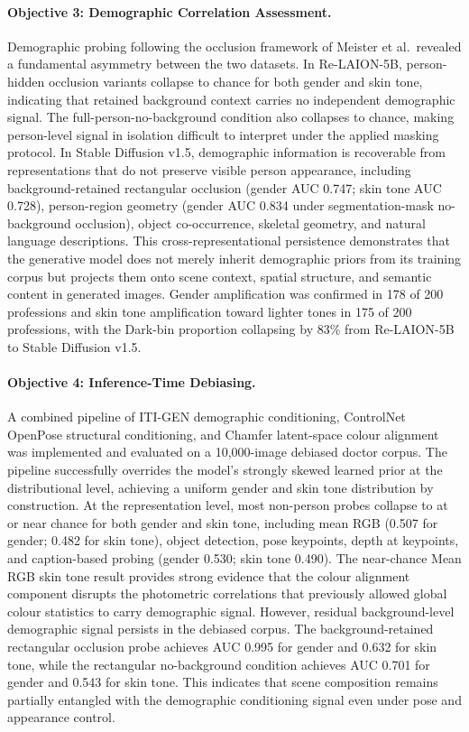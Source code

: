 \paragraph{Objective 3: Demographic Correlation Assessment.}
Demographic probing following the occlusion framework of Meister et al.\ revealed a
fundamental asymmetry between the two datasets. In Re-LAION-5B, person-hidden occlusion
variants collapse to chance for both gender and skin tone, indicating that retained
background context carries no independent demographic signal. The
full-person-no-background condition also collapses to chance, making person-level signal
in isolation difficult to interpret under the applied masking protocol. In Stable
Diffusion v1.5, demographic information is recoverable from representations that do not
preserve visible person appearance, including background-retained rectangular occlusion
(gender AUC 0.747; skin tone AUC 0.728), person-region geometry (gender AUC 0.834 under
segmentation-mask no-background occlusion), object co-occurrence, skeletal geometry, and
natural language descriptions. This cross-representational persistence demonstrates that
the generative model does not merely inherit demographic priors from its training corpus
but projects them onto scene context, spatial structure, and semantic content in generated
images. Gender amplification was confirmed in 178 of 200 professions and skin tone
amplification toward lighter tones in 175 of 200 professions, with the Dark-bin
proportion collapsing by 83\% from Re-LAION-5B to Stable Diffusion v1.5.

\paragraph{Objective 4: Inference-Time Debiasing.}
A combined pipeline of ITI-GEN demographic conditioning, ControlNet OpenPose structural
conditioning, and Chamfer latent-space colour alignment was implemented and evaluated on
a 10,000-image debiased doctor corpus. The pipeline successfully overrides the model's
strongly skewed learned prior at the distributional level, achieving a uniform gender and
skin tone distribution by construction. At the representation level, most non-person
probes collapse to at or near chance for both gender and skin tone, including mean RGB
(0.507 for gender; 0.482 for skin tone), object detection, pose keypoints, depth at
keypoints, and caption-based probing (gender 0.530; skin tone 0.490). The near-chance
Mean RGB skin tone result provides strong evidence that the colour alignment component
disrupts the photometric correlations that previously allowed global colour statistics to
carry demographic signal. However, residual background-level demographic signal persists
in the debiased corpus. The background-retained rectangular occlusion probe achieves AUC
0.995 for gender and 0.632 for skin tone, while the rectangular no-background condition
achieves AUC 0.701 for gender and 0.543 for skin tone. This indicates that scene
composition remains partially entangled with the demographic conditioning signal even
under pose and appearance control.

